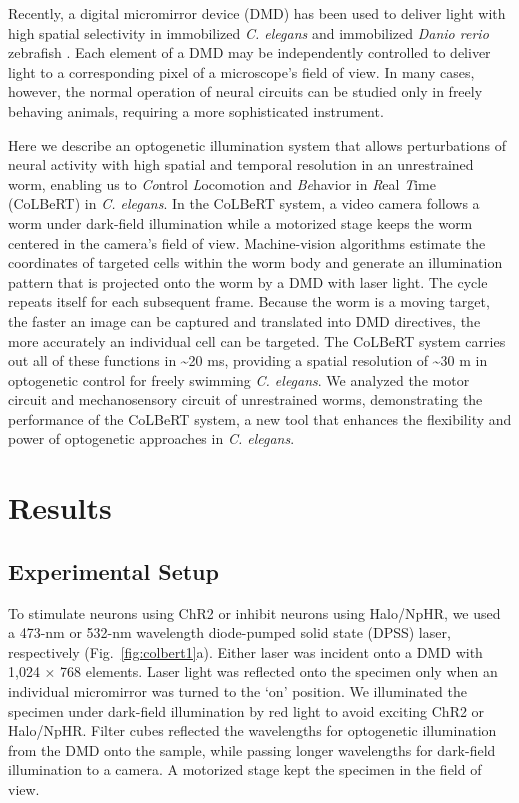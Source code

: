 Recently, a digital micromirror device (DMD) has been used to deliver light with high spatial selectivity in immobilized \textit{C. elegans} and immobilized \textit{Danio rerio} zebrafish \citep{wyart_optogenetic_2009}. Each element of a DMD may be independently controlled to deliver light to a corresponding pixel of a microscope's field of view. 
In many cases, however, the normal operation of neural circuits can be studied only in freely behaving animals, requiring a more sophisticated instrument.

Here we describe an optogenetic illumination system that allows perturbations of neural activity with high spatial and temporal resolution in an unrestrained worm, enabling us to \emph{Co}ntrol \emph{L}ocomotion and \emph{Be}havior in \emph{R}eal \emph{T}ime (CoLBeRT) in \textit{C. elegans}. In the CoLBeRT system, a video camera follows a worm under dark-field illumination while a motorized stage keeps the worm centered in the camera's field of view. Machine-vision algorithms estimate the coordinates of targeted cells within the worm body and generate an illumination pattern that is projected onto the worm by a DMD with laser light. The cycle repeats itself for each subsequent frame. Because the worm is a moving target, the faster an image can be captured and translated into DMD directives, the more accurately an individual cell can be targeted. The CoLBeRT system carries out all of these functions in \textasciitilde20 ms, providing a spatial resolution of \textasciitilde30 \textmu m in optogenetic control for freely swimming \textit{C. elegans}. We analyzed the motor circuit and mechanosensory circuit of unrestrained worms, demonstrating the performance of the CoLBeRT system, a new tool that enhances the flexibility and power of optogenetic approaches in \textit{C. elegans}.

\section{Results}
\subsection{Experimental Setup}
To stimulate neurons using ChR2 or inhibit neurons using Halo/NpHR, we used a 473-nm or 532-nm wavelength diode-pumped solid state (DPSS) laser, respectively  (Fig.~\ref{fig:colbert1}a). Either laser was incident onto a DMD with 1,024 × 768 elements. Laser light was reflected onto the specimen only when an individual micromirror was turned to the `on' position. We illuminated the specimen under dark-field illumination by red light to avoid exciting ChR2 or Halo/NpHR. Filter cubes reflected the wavelengths for optogenetic illumination from the DMD onto the sample, while passing longer wavelengths for dark-field illumination to a camera. A motorized stage kept the specimen in the field of view.


